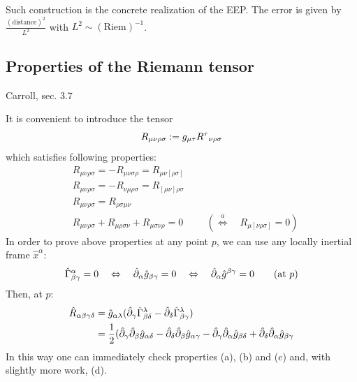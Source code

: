 \documentclass[../main/main.tex]{subfiles}
\begin{document}
Such construction is the concrete realization of the EEP. The error is given by $\frac{(\text{distance})^2}{L^2}$ with $L^2\sim(\text{Riem})^{-1}$.


\subsection{Properties of the Riemann tensor}

\textsf{Carroll, sec. 3.7}

It is convenient to introduce the tensor 
\[R_{\mu\nu\rho\sigma}:=g_{\mu\tau}{{R}^{\tau}}_{\nu \rho \sigma}\]
which satisfies following properties:
\begin{subequations}
\begin{align}
&R_{\mu\nu\rho\sigma}=-R_{\mu\nu\sigma\rho}=R_{\mu\nu[\rho\sigma]}\\
&R_{\mu\nu\rho\sigma}=-R_{\nu\mu\rho\sigma}=R_{[\mu\nu]\rho\sigma}\\
&R_{\mu\nu\rho\sigma}=R_{\rho\sigma\mu\nu}\\
&R_{\mu\nu\rho\sigma}+R_{\mu\rho\sigma\nu}+R_{\mu\sigma\nu\rho}=0\hspace{1cm}(\overset{a}\Leftrightarrow\quad R_{\mu[\nu\rho\sigma]}=0)
\end{align}\end{subequations}
In order to prove above properties at any point $p$, we can use any locally inertial frame $\hat x^\alpha$:
\[{\hat\Gamma}^{\alpha}_{\beta \gamma}=0\quad\Leftrightarrow\quad\hat\partial_\alpha\hat g_{\beta\gamma}=0\quad\Leftrightarrow\quad\hat\partial_\alpha\hat g^{\beta\gamma}=0\qquad(\text{at }p)\]
Then, at $p$:
\begin{align*}
\hat R_{\alpha\beta\gamma\delta}
&=\hat g_{\alpha\lambda}(\hat\partial_\gamma{\hat\Gamma}^{\lambda}_{\beta \delta}-\hat\partial_\delta{\hat\Gamma}^{\lambda}_{\beta \gamma})\hspace{2cm}\\
&=\frac12(\hat\partial_\gamma\hat\partial_\beta\hat g_{\alpha\delta}-\hat\partial_\delta\hat\partial_\beta\hat g_{\alpha\gamma}-\hat\partial_\gamma\hat\partial_\alpha\hat g_{\beta\delta}+\hat\partial_\delta\hat\partial_\alpha\hat g_{\beta\gamma}
\end{align*}
In this way one can immediately check properties (a), (b) and (c) and, with slightly more work, (d).
\end{document}

